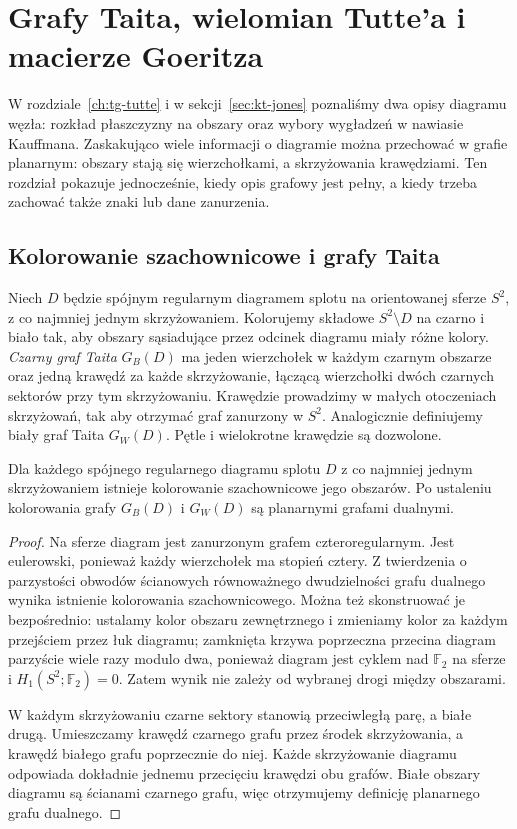 \chapter{Grafy Taita, wielomian Tutte'a i macierze Goeritza}
\label{ch:tg-tait-goeritz}

W rozdziale~\ref{ch:tg-tutte} i w sekcji~\ref{sec:kt-jones}
poznaliśmy dwa opisy diagramu węzła: rozkład płaszczyzny
na obszary oraz wybory wygładzeń w nawiasie Kauffmana.
Zaskakująco wiele informacji o diagramie można przechować
w grafie planarnym: obszary stają się wierzchołkami,
a skrzyżowania krawędziami. Ten rozdział pokazuje
jednocześnie, kiedy opis grafowy jest pełny, a kiedy
trzeba zachować także znaki lub dane zanurzenia.

\section{Kolorowanie szachownicowe i grafy Taita}
\label{sec:tg-tait-def}

\begin{definicja}
Niech $D$ będzie spójnym regularnym diagramem splotu
na orientowanej sferze $S^2$, z co najmniej jednym
skrzyżowaniem. Kolorujemy składowe $S^2\setminus D$
na czarno i biało tak, aby obszary sąsiadujące przez
odcinek diagramu miały różne kolory. \emph{Czarny graf
Taita} $G_B(D)$ ma jeden wierzchołek w każdym czarnym
obszarze oraz jedną krawędź za każde skrzyżowanie,
łączącą wierzchołki dwóch czarnych sektorów przy tym
skrzyżowaniu. Krawędzie prowadzimy w małych otoczeniach
skrzyżowań, tak aby otrzymać graf zanurzony w $S^2$.
Analogicznie definiujemy biały graf Taita $G_W(D)$.
Pętle i wielokrotne krawędzie są dozwolone.
\end{definicja}

\begin{stwierdzenie}
Dla każdego spójnego regularnego diagramu splotu $D$
z co najmniej jednym skrzyżowaniem istnieje kolorowanie
szachownicowe jego obszarów. Po ustaleniu kolorowania
grafy $G_B(D)$ i $G_W(D)$ są planarnymi grafami dualnymi.
\end{stwierdzenie}
\begin{proof}
Na sferze diagram jest zanurzonym grafem czteroregularnym.
Jest eulerowski, ponieważ każdy wierzchołek ma stopień
cztery. Z twierdzenia o parzystości obwodów ścianowych
równoważnego dwudzielności grafu dualnego wynika
istnienie kolorowania szachownicowego. Można też
skonstruować je bezpośrednio: ustalamy kolor obszaru
zewnętrznego i zmieniamy kolor za każdym przejściem
przez łuk diagramu; zamknięta krzywa poprzeczna przecina
diagram parzyście wiele razy modulo dwa, ponieważ diagram
jest cyklem nad $\mathbb F_2$ na sferze i
$H_1(S^2;\mathbb F_2)=0$. Zatem wynik nie zależy od
wybranej drogi między obszarami.

W każdym skrzyżowaniu czarne sektory stanowią przeciwległą
parę, a białe drugą. Umieszczamy krawędź czarnego grafu
przez środek skrzyżowania, a krawędź białego grafu
poprzecznie do niej. Każde skrzyżowanie diagramu odpowiada
dokładnie jednemu przecięciu krawędzi obu grafów.
Białe obszary diagramu są ścianami czarnego grafu,
więc otrzymujemy definicję planarnego grafu dualnego.
\end{proof}

